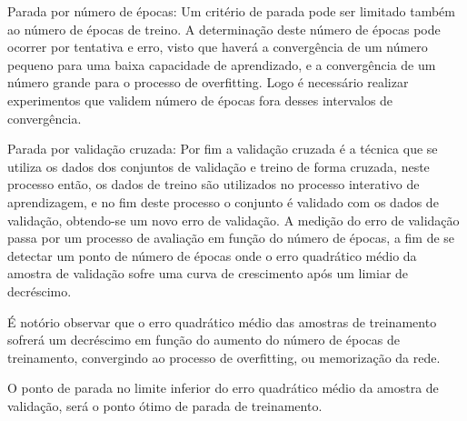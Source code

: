 \documentclass[	12pt, Times, openright, twoside, a4paper, english, brazil]{abntex2}
\begin{document}
            	Parada por número de épocas:
            	Um critério de parada pode ser limitado também ao número de épocas de treino. A determinação  deste número de épocas pode ocorrer por tentativa e erro, visto que haverá a convergência de um número pequeno para uma baixa capacidade de aprendizado, e a convergência de um número grande para o processo de overfitting. Logo é necessário realizar experimentos que validem número de épocas fora desses intervalos de convergência.
            	
            	Parada por validação cruzada:
            	Por fim a validação cruzada é a técnica que se utiliza os dados dos conjuntos de validação e treino de forma cruzada, neste processo então, os dados de treino são utilizados no processo interativo de aprendizagem, e no fim deste processo o conjunto é validado com os dados de validação, obtendo-se um novo erro de validação.
            	A medição do erro de validação passa por um processo de avaliação em função do número de épocas, a fim de se detectar um ponto de número de épocas onde o erro quadrático médio da amostra de validação sofre uma curva de crescimento após um limiar de decréscimo.
            	
            	É notório observar que o erro quadrático médio das amostras de treinamento sofrerá um decréscimo em função do aumento do número de épocas de treinamento, convergindo ao processo de overfitting, ou memorização da rede.
            	
            	O ponto de parada no limite inferior do erro quadrático médio da amostra de validação, será o ponto ótimo de parada de treinamento.
          	
          	\begin{figure}[H]
          	\end{figure}
        
\end{document}
